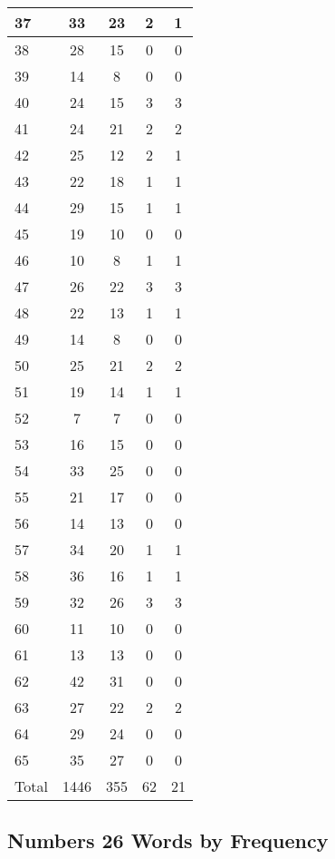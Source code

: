 \begin{center}
\begin{longtable}{l|c|c|c|c}
37 & 33 & 23 & 2 & 1\\ \hline
38 & 28 & 15 & 0 & 0\\ \hline
39 & 14 & 8 & 0 & 0\\ \hline
40 & 24 & 15 & 3 & 3\\ \hline
41 & 24 & 21 & 2 & 2\\ \hline
42 & 25 & 12 & 2 & 1\\ \hline
43 & 22 & 18 & 1 & 1\\ \hline
44 & 29 & 15 & 1 & 1\\ \hline
45 & 19 & 10 & 0 & 0\\ \hline
46 & 10 & 8 & 1 & 1\\ \hline
47 & 26 & 22 & 3 & 3\\ \hline
48 & 22 & 13 & 1 & 1\\ \hline
49 & 14 & 8 & 0 & 0\\ \hline
50 & 25 & 21 & 2 & 2\\ \hline
51 & 19 & 14 & 1 & 1\\ \hline
52 & 7 & 7 & 0 & 0\\ \hline
53 & 16 & 15 & 0 & 0\\ \hline
54 & 33 & 25 & 0 & 0\\ \hline
55 & 21 & 17 & 0 & 0\\ \hline
56 & 14 & 13 & 0 & 0\\ \hline
57 & 34 & 20 & 1 & 1\\ \hline
58 & 36 & 16 & 1 & 1\\ \hline
59 & 32 & 26 & 3 & 3\\ \hline
60 & 11 & 10 & 0 & 0\\ \hline
61 & 13 & 13 & 0 & 0\\ \hline
62 & 42 & 31 & 0 & 0\\ \hline
63 & 27 & 22 & 2 & 2\\ \hline
64 & 29 & 24 & 0 & 0\\ \hline
65 & 35 & 27 & 0 & 0\\ \hline
Total & 1446 & 355 & 62 & 21
\end{longtable}
\end{center}





\subsection{Numbers 26 Words by Frequency}


\normalsize
 
